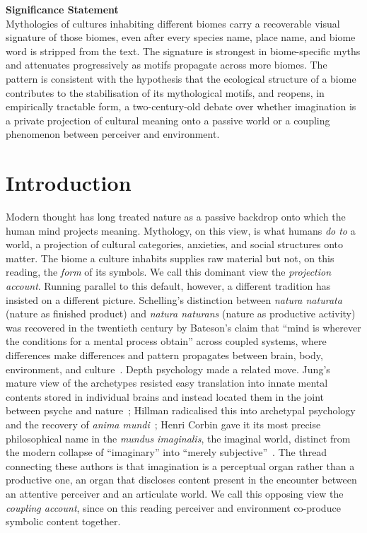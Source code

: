 \documentclass[11pt,a4paper]{article}
\begin{document}
\noindent\textbf{Significance Statement}\\[0.4em]
Mythologies of cultures inhabiting different biomes carry a recoverable
visual signature of those biomes, even after every species name, place
name, and biome word is stripped from the text. The signature is
strongest in biome-specific myths and attenuates progressively as
motifs propagate across more biomes. The pattern is consistent with
the hypothesis that the ecological structure of a biome contributes
to the stabilisation of its mythological motifs, and reopens, in
empirically tractable form, a two-century-old debate over whether
imagination is a private projection of cultural meaning onto a
passive world or a coupling phenomenon between perceiver and
environment.

\vspace{1em}

\section*{Introduction}

Modern thought has long treated nature as a passive backdrop onto
which the human mind projects meaning. Mythology, on this view, is
what humans \emph{do to} a world, a projection of cultural
categories, anxieties, and social structures onto matter. The biome
a culture inhabits supplies raw material but not, on this reading,
the \emph{form} of its symbols. We call this dominant view the
\emph{projection account}. Running parallel to this default, however,
a different tradition has insisted on a different picture.
Schelling's distinction between \emph{natura naturata} (nature as
finished product) and \emph{natura naturans} (nature as productive
activity)~\citep{schelling1797ideas,schelling1799outline} was
recovered in the twentieth century by Bateson's claim that ``mind is
wherever the conditions for a mental process obtain'' across coupled
systems, where differences make differences and pattern propagates
between brain, body, environment, and
culture~\citep{bateson1972steps,bateson1979mind}. Depth psychology
made a related move. Jung's mature view of the archetypes resisted
easy translation into innate mental contents stored in individual
brains and instead located them in the joint between psyche and
nature~\citep{jung1959archetypes}; Hillman radicalised this into
archetypal psychology and the recovery of \emph{anima
mundi}~\citep{hillman1975revisioning,hillman1981thought}; Henri
Corbin gave it its most precise philosophical name in the \emph{mundus
imaginalis}, the imaginal world, distinct from the modern collapse
of ``imaginary'' into ``merely
subjective''~\citep{corbin1972mundus,barfield1957saving,abram1996spell,ingold2000perception}.
The thread connecting these authors is that imagination is a
perceptual organ rather than a productive one, an organ that
discloses content present in the encounter between an attentive
perceiver and an articulate world. We call this opposing view the
\emph{coupling account}, since on this reading perceiver and
environment co-produce symbolic content together.
\end{document}
